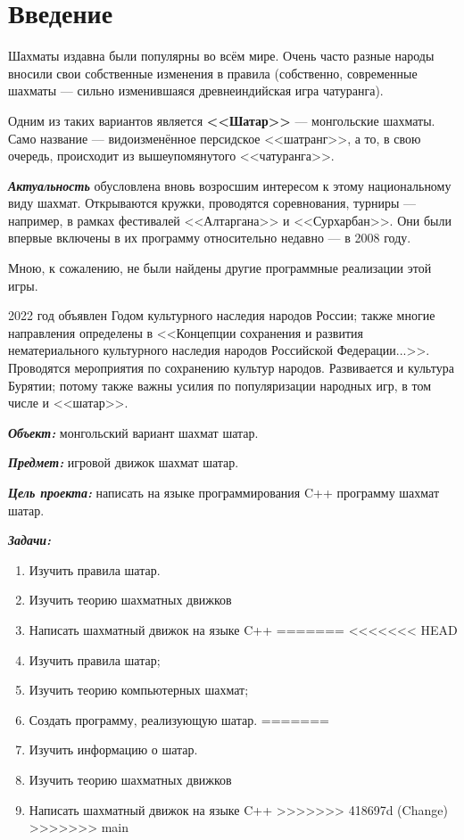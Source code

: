 {
	\chapter*{Введение}
	Шахматы издавна были популярны во всём мире. Очень часто разные народы вносили свои собственные изменения в правила (собственно, современные шахматы --- сильно изменившаяся древнеиндийская игра чатуранга). 
	
	Одним из таких вариантов является \textbf{<<Шатар>>} --- монгольские шахматы. Само название --- видоизменённое персидское <<шатранг>>, а то, в свою очередь, происходит из вышеупомянутого <<чатуранга>>.
	
	\textbf{\textit{Актуальность}} обусловлена вновь возросшим интересом к этому национальному виду шахмат. Открываются кружки, проводятся соревнования, турниры --- например, в рамках фестивалей <<Алтаргана>> и <<Сурхарбан>>. Они были впервые включены в их программу относительно недавно --- в 2008 году.
	
	Мною, к сожалению, не были найдены другие программные реализации этой игры.
	
	2022 год  объявлен Годом культурного наследия народов России; также многие направления определены в <<Концепции сохранения и развития нематериального культурного наследия народов Российской Федерации...>>. Проводятся мероприятия по сохранению культур народов. Развивается и культура Бурятии; потому  также важны  усилия по популяризации народных игр, в том числе и <<шатар>>.
	
	\textbf{\textit{Объект:}} монгольский вариант шахмат шатар.
	
	\textbf{\textit{Предмет:}} игровой движок шахмат шатар.
	
	\textbf{\textit{Цель проекта:}} написать на языке программирования C++ программу шахмат шатар.
	
	\textbf{\textit{Задачи:}}
	
	\begin{enumerate}
<<<<<<< HEAD
		\item Изучить правила шатар.
		\item Изучить теорию шахматных движков
		\item Написать шахматный движок на языке C++
=======
<<<<<<< HEAD
		\item Изучить правила шатар;
		\item Изучить теорию компьютерных шахмат;
		\item Создать программу, реализующую шатар.
=======
		\item Изучить информацию о шатар.
		\item Изучить теорию шахматных движков
		\item Написать шахматный движок на языке C++
>>>>>>> 418697d (Change)
>>>>>>> main
	\end{enumerate}
	\clearpage
}